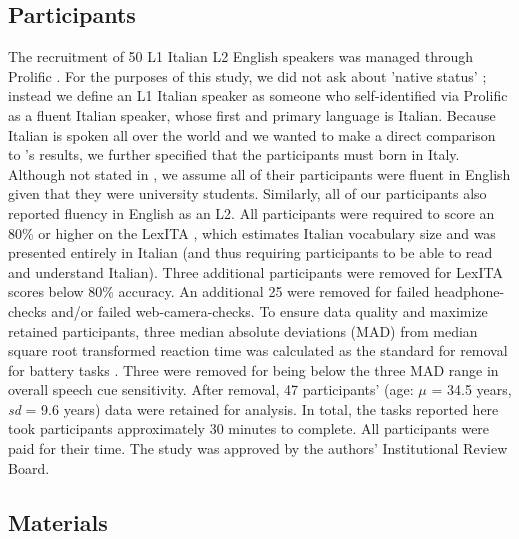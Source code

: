 
\subsection{Participants}
The recruitment of 50 L1 Italian L2 English speakers was managed through Prolific \citep{Palan_2018}. For the purposes of this study, we did not ask about 'native status' \citep{Brown_Tusmagambet_Rahming_Tu_DeSalvo_Wiener_2023}; instead we define an L1 Italian speaker as someone who self-identified via Prolific as a fluent Italian speaker, whose first and primary language is Italian. Because Italian is spoken all over the world and we wanted to make a direct comparison to \cite{Sulpizio_McQueen_2012}'s results, we further specified that the participants must born in Italy. Although not stated in \cite{Sulpizio_McQueen_2012}, we assume all of their participants were fluent in English given that they were university students. Similarly, all of our participants also reported fluency in English as an L2. All participants were required to score an 80\% or higher on the LexITA \citep{Amenta2021}, which estimates Italian vocabulary size and was presented entirely in Italian (and thus requiring participants to be able to read and understand Italian). Three additional participants were removed for LexITA scores below 80\% accuracy. An additional 25 were removed for failed headphone-checks \citep{milne_2021} and/or failed web-camera-checks. To ensure data quality and maximize retained participants, three median absolute deviations (MAD) from median square root transformed reaction time was calculated as the standard for removal for battery tasks \citep{Leys_2013}. Three were removed for being below the three MAD \citep{Leys_2013} range in overall speech cue sensitivity. After removal, 47 participants' (age: $\mu$ = 34.5 years, \textit{sd} = 9.6 years) data were retained for analysis. In total, the tasks reported here took participants approximately 30 minutes to complete. All participants were paid for their time. The study was approved by the authors' Institutional Review Board.

\subsection{Materials}

